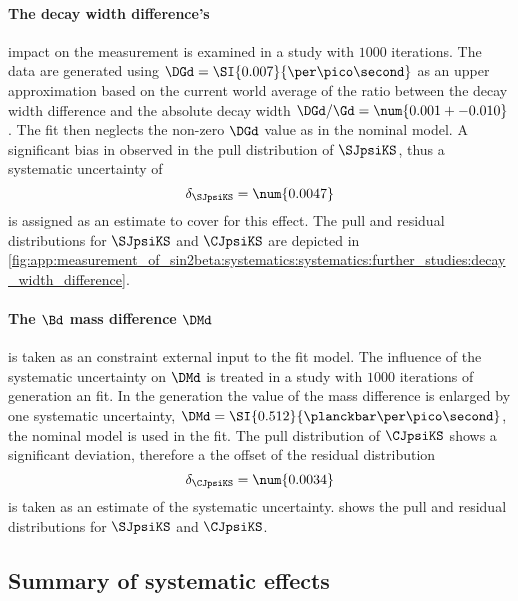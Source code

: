 \paragraph{The \Bd decay width difference's} impact on the \CP measurement is examined in a \ToyMC study with $\num{1000}$ iterations. The data are generated using $\DGd = \SI{0.007}{\per\pico\second}$ as an upper approximation based on the current world average of the ratio between the decay width difference and the absolute decay width $\DGd/\Gd = \num{0.001 +- 0.010}$ \cite{Amhis:2014hma}. The fit then neglects the non-zero $\DGd$ value as in the nominal model. A significant bias in observed in the pull distribution of $\SJpsiKS$, thus a systematic uncertainty of
%
\begin{equation}
  \delta_{\SJpsiKS} = \num{0.0047}
\end{equation}
%
is assigned as an estimate to cover for this effect. The pull and residual
distributions for $\SJpsiKS$ and $\CJpsiKS$ are depicted in 
\cref{fig:app:measurement_of_sin2beta:systematics:systematics:further_studies:decay_width_difference}.

\paragraph{The $\Bd$ mass difference $\DMd$} is taken as an constraint external input to the fit model. The influence of the systematic uncertainty on $\DMd$ is treated in a \ToyMC study with $\num{1000}$ iterations of generation an fit. In the generation the value of the mass difference is enlarged by one systematic uncertainty, \ie $\DMd = \SI{0.512}{\planckbar\per\pico\second}$, the nominal model is used in the fit. The pull distribution of $\CJpsiKS$ shows a significant deviation, therefore a the offset of the residual distribution 
%
\begin{equation}
  \delta_{\CJpsiKS} = \num{0.0034}
\end{equation}
%
is taken as an estimate of the systematic uncertainty.
shows the pull and residual distributions for $\SJpsiKS$ and $\CJpsiKS$.

\subsection{Summary of systematic effects}
\label{sec:measurement_of_sin2beta:systematics:summary}

